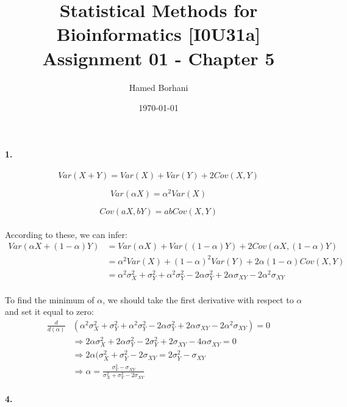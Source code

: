 \documentclass[11pt]{report}
\title{\textbf{Statistical Methods for Bioinformatics [I0U31a] \\Assignment 01 - Chapter 5}}
\author{Hamed Borhani}
\date{\today}
\begin{document}
\maketitle

\newpage
\paragraph{1. }
\begin{equation}
Var(X+Y)=Var(X)+Var(Y)+2Cov(X,Y)
\end{equation}

\begin{equation}
Var(\alpha X)=\alpha^{2}Var(X)
\end{equation}

\begin{equation}
Cov(aX,bY)=abCov(X,Y)
\end{equation}
\\ According to these, we can infer:
\\ \begin{align*} 
Var(\alpha X + (1-\alpha)Y) &= Var(\alpha X) + Var((1-\alpha)Y) + 2Cov(\alpha X, (1-\alpha)Y)
\\ &= \alpha^{2}Var(X) + (1-\alpha)^{2}Var(Y) + 2\alpha(1-\alpha)Cov(X,Y)
\\ &= \alpha^{2}\sigma^{2}_{X} + \sigma^{2}_{Y} + \alpha^{2}\sigma^{2}_{Y} - 2\alpha\sigma^{2}_{Y} + 2\alpha\sigma_{XY} - 2\alpha^{2}\sigma_{XY}
\end{align*}
\\To find the minimum of $\alpha$, we should take the first derivative with respect to $\alpha$ and set it equal to zero:
\begin{align*}
\frac{d}{d(\alpha)}&(\alpha^{2}\sigma^{2}_{X} + \sigma^{2}_{Y} + \alpha^{2}\sigma^{2}_{Y} - 2\alpha\sigma^{2}_{Y} + 2\alpha\sigma_{XY} - 2\alpha^{2}\sigma_{XY}) = 0
\\ &\Rightarrow 2\alpha\sigma^{2}_{X} + 2\alpha\sigma^{2}_{Y} - 2\sigma^{2}_{Y} + 2\sigma_{XY} - 4\alpha\sigma_{XY} = 0
\\ &\Rightarrow 2\alpha(\sigma^{2}_{X} + \sigma^{2}_{Y} - 2\sigma_{XY} = 2\sigma^{2}_{Y} - \sigma_{XY}
\\ &\Rightarrow \alpha = \frac{\sigma^{2}_{Y} - \sigma_{XY}}{\sigma^{2}_{X} + \sigma^{2}_{Y} - 2\sigma_{XY}}
\end{align*}

\paragraph{4. }
\end{document}
